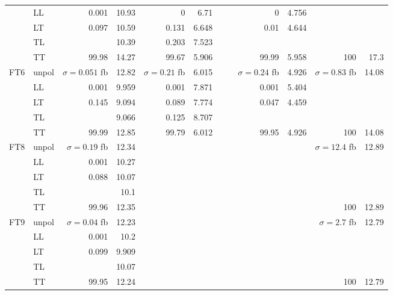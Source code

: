 \begin{table}[h]
{\begin{tabular}{llrrrrrrrrrr}
 & LL & \num{0.001} & \num{10.93} & \num{0} & \num{6.71} &  &  & \num{0} & \num{4.756} &  &  \\
 & LT & \num{0.097} & \num{10.59} & \num{0.131} & \num{6.648} &  &  & \num{0.01} & \num{4.644} &  &  \\
 & TL &  & \num{10.39} & \num{0.203} & \num{7.523} &  &  &  &  &  &  \\
 & TT & \num{99.98} & \num{14.27} & \num{99.67} & \num{5.906} &  &  & \num{99.99} & \num{5.958} & \num{100} & \num{17.3} \\
\midrule
\multirow{5}{*}{FT6}
 & unpol & $\sigma = \num{0.051}$ fb & \num{12.82} & $\sigma = \num{0.21}$ fb & \num{6.015} &  &  & $\sigma = \num{0.24}$ fb & \num{4.926} & $\sigma = \num{0.83}$ fb & \num{14.08} \\
 & LL & \num{0.001} & \num{9.959} & \num{0.001} & \num{7.871} &  &  & \num{0.001} & \num{5.404} &  &  \\
 & LT & \num{0.145} & \num{9.094} & \num{0.089} & \num{7.774} &  &  & \num{0.047} & \num{4.459} &  &  \\
 & TL &  & \num{9.066} & \num{0.125} & \num{8.707} &  &  &  &  &  &  \\
 & TT & \num{99.99} & \num{12.85} & \num{99.79} & \num{6.012} &  &  & \num{99.95} & \num{4.926} & \num{100} & \num{14.08} \\
\midrule
\multirow{5}{*}{FT8}
 & unpol & $\sigma = \num{0.19}$ fb & \num{12.34} &  &  &  &  &  &  & $\sigma = \num{12.4}$ fb & \num{12.89} \\
 & LL & \num{0.001} & \num{10.27} &  &  &  &  &  &  &  &  \\
 & LT & \num{0.088} & \num{10.07} &  &  &  &  &  &  &  &  \\
 & TL &  & \num{10.1} &  &  &  &  &  &  &  &  \\
 & TT & \num{99.96} & \num{12.35} &  &  &  &  &  &  & \num{100} & \num{12.89} \\
\midrule
\multirow{5}{*}{FT9}
 & unpol & $\sigma = \num{0.04}$ fb & \num{12.23} &  &  &  &  &  &  & $\sigma = \num{2.7}$ fb & \num{12.79} \\
 & LL & \num{0.001} & \num{10.2} &  &  &  &  &  &  &  &  \\
 & LT & \num{0.099} & \num{9.909} &  &  &  &  &  &  &  &  \\
 & TL &  & \num{10.07} &  &  &  &  &  &  &  &  \\
 & TT & \num{99.95} & \num{12.24} &  &  &  &  &  &  & \num{100} & \num{12.79} \\
\bottomrule
\end{tabular}
}%
\end{table}